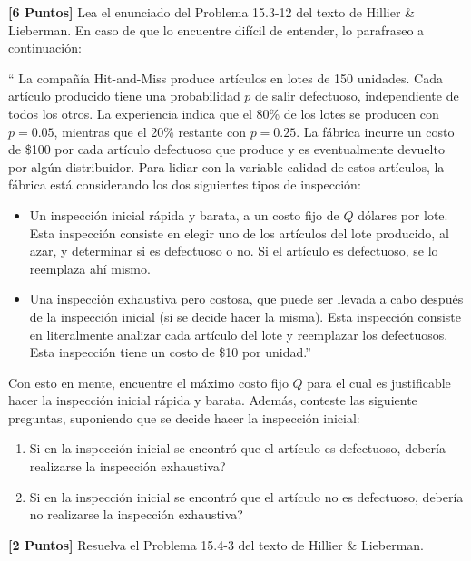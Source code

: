 \documentclass[ a4paper, twoside, 11pt]{article}
\begin{document}
\begin{problem}
\label{prob:H&L_P15_3_12}
\textbf{[6 Puntos]} Lea el enunciado del Problema 15.3-12 del texto de Hillier \& Lieberman. En caso de que lo encuentre dif\'icil de entender, lo parafraseo a continuaci\'on: 

``
La compa\~n\'ia Hit-and-Miss produce art\'iculos en lotes de 150 unidades. Cada art\'iculo producido tiene una probabilidad $p$ de salir defectuoso, independiente de todos los otros. La experiencia indica que el 80\% de los lotes se producen con $p = 0.05$, mientras que el 20\% restante con $p = 0.25$. La f\'abrica incurre un costo de \$100 por cada art\'iculo defectuoso que produce y es eventualmente devuelto por alg\'un distribuidor. Para lidiar con la variable calidad de estos art\'iculos, la f\'abrica est\'a considerando los dos siguientes tipos de inspecci\'on: 
\begin{itemize}
\item Un inspecci\'on inicial r\'apida y barata, a un costo fijo de $Q$ d\'olares por lote. Esta inspecci\'on consiste en elegir uno de los art\'iculos del lote producido, al azar, y determinar si es defectuoso o no. Si el art\'iculo es defectuoso, se lo reemplaza ah\'i mismo. 
\item Una inspecci\'on exhaustiva pero costosa, que puede ser llevada a cabo despu\'es de la inspecci\'on inicial (si se decide hacer la misma). Esta inspecci\'on consiste en literalmente analizar cada art\'iculo del lote y reemplazar los defectuosos. Esta inspecci\'on tiene un costo de \$10 por unidad.'' 
\end{itemize}

Con esto en mente, encuentre el m\'aximo costo fijo $Q$ para el cual es justificable hacer la inspecci\'on inicial r\'apida y barata. Adem\'as, conteste las siguiente preguntas, suponiendo que se decide hacer la inspecci\'on inicial: 
\begin{enumerate}[label=\textbf{\alph*)}]
\item Si en la inspecci\'on inicial se encontr\'o que el art\'iculo es defectuoso, deber\'ia realizarse la inspecci\'on exhaustiva? 
\item Si en la inspecci\'on inicial se encontr\'o que el art\'iculo no es defectuoso, deber\'ia no realizarse la inspecci\'on exhaustiva? 
\end{enumerate}

\end{problem}
\fullskip

\begin{problem}
\label{prob:H&L_P15_4_3}
\textbf{[2 Puntos]} Resuelva el Problema 15.4-3 del texto de Hillier \& Lieberman. 

\end{problem}
\fullskip
\end{document}
